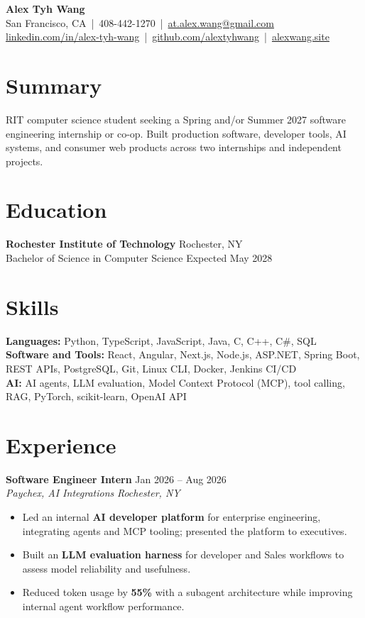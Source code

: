 \documentclass[10pt,letterpaper]{article}
\newif\ifresumeFirstRole
\newcommand{\resumeRole}[4]{%
  \ifresumeFirstRole
    \global\resumeFirstRolefalse
  \else
    \vspace{2pt}%
  \fi
  \textbf{#1} \hfill #2\\
  \textit{#3} \hfill \textit{#4}
}
\begin{document}
\fontsize{10.5pt}{12.7pt}\selectfont

\begin{center}
{\Large \textbf{Alex Tyh Wang}}\\
San Francisco, CA \,|\, 408-442-1270 \,|\, \href{mailto:at.alex.wang@gmail.com}{at.alex.wang@gmail.com}\\
\small \href{https://www.linkedin.com/in/alex-tyh-wang/}{linkedin.com/in/alex-tyh-wang} \,|\, \href{https://github.com/alextyhwang}{github.com/alextyhwang} \,|\, \href{https://alexwang.site}{alexwang.site}
\end{center}

\section*{Summary}
RIT computer science student seeking a Spring and/or Summer 2027 software engineering internship or co-op. Built production software, developer tools, AI systems, and consumer web products across two internships and independent projects.

\section*{Education}
\textbf{Rochester Institute of Technology} \hfill Rochester, NY\\
Bachelor of Science in Computer Science \hfill Expected May 2028

\section*{Skills}
\textbf{Languages:} Python, TypeScript, JavaScript, Java, C, C++, C\#, SQL\\
\textbf{Software and Tools:} React, Angular, Next.js, Node.js, ASP.NET, Spring Boot, REST APIs, PostgreSQL, Git, Linux CLI, Docker, Jenkins CI/CD\\
\textbf{AI:} AI agents, LLM evaluation, Model Context Protocol (MCP), tool calling, RAG, PyTorch, scikit-learn, OpenAI API

\section*{Experience}
\resumeRole{Software Engineer Intern}{Jan 2026 -- Aug 2026}{Paychex, AI Integrations}{Rochester, NY}
\begin{itemize}
  \item Led an internal \textbf{AI developer platform} for enterprise engineering, integrating agents and MCP tooling; presented the platform to executives.
  \item Built an \textbf{LLM evaluation harness} for developer and Sales workflows to assess model reliability and usefulness.
  \item Reduced token usage by \textbf{55\%} with a subagent architecture while improving internal agent workflow performance.
\end{itemize}
\end{document}
